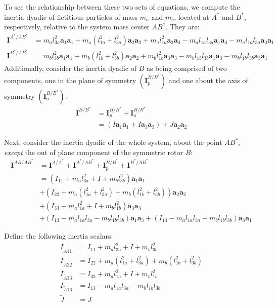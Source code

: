 \documentclass[letterpaper,11pt]{article}
\newcommand{\bs}[1]{ \boldsymbol{ #1 } }
\begin{document}
To see the relationship between these two sets of equations, we compute the
inertia dyadic of fictitious particles of mass $m_a$ and $m_b$, located at
$A^*$ and $B^*$, respectively, relative to the system mass center $AB^*$.  They
are:
\begin{align*}
  \bs{I}^{A^* / AB^*} & =
  m_al_{3a}^2\bs{a}_1\bs{a}_1 + m_a(l_{1a}^2 + l_{3a}^2)\bs{a}_2 \bs{a}_2 +
  m_al_{1a}^2\bs{a}_3\bs{a}_3 -
  m_al_{1a}l_{3a}\bs{a}_1\bs{a}_3 - m_al_{1a}l_{3a}\bs{a}_3\bs{a}_1 \\
  \bs{I}^{B^* / AB^*} & =
  m_bl_{3b}^2\bs{a}_1\bs{a}_1 + m_b(l_{1b}^2 + l_{3b}^2)\bs{a}_2 \bs{a}_2 +
  m_bl_{1b}^2\bs{a}_3\bs{a}_3 -
  m_bl_{1b}l_{3b}\bs{a}_1\bs{a}_3 - m_bl_{1b}l_{3b}\bs{a}_3\bs{a}_1
\end{align*}
Additionally, consider the inertia dyadic of $B$ as being comprised of two
components, one in the plane of symmetry $(\bs{I}^{B/B^*}_p)$ and one about
the axis of symmetry $(\bs{I}^{B/B^*}_a)$:
\begin{align*}
  \bs{I}^{B/B^*} & = \bs{I}^{B/B^*}_p + \bs{I}^{B/B^*}_a \\
  & = (I\bs{a}_1\bs{a}_1 + I\bs{a}_3\bs{a}_3) + J\bs{a}_2\bs{a}_2
\end{align*}

Next, consider the inertia dyadic of the whole system, about the point $AB^*$,
{\it{except}} the out of plane component of the symmetric rotor $B$:
\begin{align*}
  \bs{I}^{AB/AB^*} & = \bs{I}^{A/A^*} + \bs{I}^{A^*/AB^*} + \bs{I}^{B/B^*}_p +
  \bs{I}^{B^*/AB^*} \\
  & = (I_{11} + m_a l_{3a}^2 + I + m_b l_{3b}^2) \bs{a}_1\bs{a}_1 \\
  &
  +
  (I_{22} + m_a(l_{1a}^2 + l_{3a}^2) + m_b(l_{1b}^2 + l_{3b}^2))\bs{a}_2\bs{a}_2
  \\
  &
  + (I_{33} + m_al_{1a}^2 + I + m_b l_{1b}^2) \bs{a}_3\bs{a}_3
  \\
  &
  +
  (I_{13} - m_a l_{1a}l_{3a} - m_b l_{1b}l_{3b}) \bs{a}_1\bs{a}_3
  +
  (I_{13} - m_a l_{1a}l_{3a} - m_b l_{1b}l_{3b}) \bs{a}_3\bs{a}_1
\end{align*}

Define the following inertia scalars:
\begin{align*}
  I_{\tilde{A}11} & = I_{11} + m_a l_{3a}^2 + I + m_b l_{3b}^2 \\
  I_{\tilde{A}22} & = I_{22} + m_a(l_{1a}^2 + l_{3a}^2) + m_b(l_{1b}^2 +
  l_{3b}^2) \\
  I_{\tilde{A}33} & = I_{33} + m_al_{1a}^2 + I + m_b l_{1b}^2 \\
  I_{\tilde{A}13} & = I_{13} - m_a l_{1a}l_{3a} - m_b l_{1b}l_{3b} \\
  \tilde{J} & = J
\end{align*}
\end{document}
